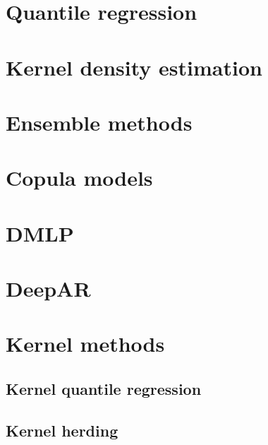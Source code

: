 \section{Quantile regression}


\section{Kernel density estimation}


\section{Ensemble methods}


\section{Copula models}

\section{DMLP}

\section{DeepAR}

\section{Kernel methods}
\subsection{Kernel quantile regression}
\subsection{Kernel herding}